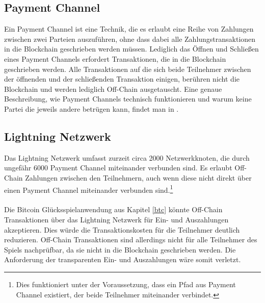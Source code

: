 \subsection{Payment Channel}

Ein Payment Channel ist eine Technik, die es erlaubt eine Reihe von Zahlungen zwischen zwei Parteien auszuführen, ohne dass dabei alle Zahlungstransaktionen in die Blockchain geschrieben werden müssen. Lediglich das Öffnen und Schließen eines Payment Channels erfordert Transaktionen, die in die Blockchain geschrieben werden. Alle Transaktionen auf die sich beide Teilnehmer zwischen der öffnenden und der schließenden Transaktion einigen, berühren nicht die Blockchain und werden lediglich Off-Chain ausgetauscht. Eine genaue Beschreibung, wie Payment Channels technisch funktionieren und warum keine Partei die jeweils andere betrügen kann, findet man in \cite{lightning_white_paper}.

\subsection{Lightning Netzwerk}

Das Lightning Netzwerk umfasst zurzeit circa 2000 Netzwerkknoten, die durch ungefähr 6000 Payment Channel miteinander verbunden sind. Es erlaubt Off-Chain Zahlungen zwischen den Teilnehmern, auch wenn diese nicht direkt über einen Payment Channel miteinander verbunden sind.\footnote{Dies funktioniert unter der Voraussetzung, dass ein Pfad aus Payment Channel existiert, der beide Teilnehmer miteinander verbindet.} \\\\
Die Bitcoin Glücksspielanwendung aus Kapitel \ref{btc} könnte Off-Chain Transaktionen über das Lightning Netzwerk für Ein- und Auszahlungen akzeptieren. Dies würde die Transaktionskosten für die Teilnehmer deutlich reduzieren. Off-Chain Transaktionen sind allerdings nicht für alle Teilnehmer des Spiels nachprüfbar, da sie nicht in die Blockchain geschrieben werden. Die Anforderung der transparenten Ein- und Auszahlungen wäre somit verletzt.